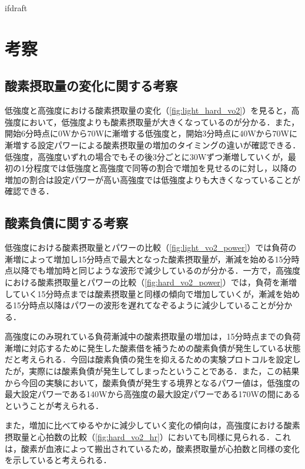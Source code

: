 \expandafter\ifx\csname ifdraft\endcsname\relax
 
\fi

\section{考察}

\subsection{酸素摂取量の変化に関する考察}

低強度と高強度における酸素摂取量の変化（\ref{fig:light_hard_vo2}）を見ると，高強度において，低強度よりも酸素摂取量が大きくなっているのが分かる．また，開始6分時点に0Wから70Wに漸増する低強度と，開始3分時点に40Wから70Wに漸増する設定パワーによる酸素摂取量の増加のタイミングの違いが確認できる．低強度，高強度いずれの場合でもその後3分ごとに30Wずつ漸増していくが，最初の1分程度では低強度と高強度で同等の割合で増加を見せるのに対し，以降の増加の割合は設定パワーが高い高強度では低強度よりも大きくなっていることが確認できる．

\subsection{酸素負債に関する考察}

低強度における酸素摂取量とパワーの比較（\ref{fig:light_vo2_power}）では負荷の漸増によって増加し15分時点で最大となった酸素摂取量が，漸減を始める15分時点以降でも増加時と同じような波形で減少しているのが分かる．一方で，高強度における酸素摂取量とパワーの比較（\ref{fig:hard_vo2_power}）では，負荷を漸増していく15分時点までは酸素摂取量と同様の傾向で増加していくが，漸減を始める15分時点以降はパワーの波形を遅れてなぞるように減少していることが分かる．

高強度にのみ現れている負荷漸減中の酸素摂取量の増加は，15分時点までの負荷漸増に対応するために発生した酸素借を補うための酸素負債が発生している状態だと考えられる．今回は酸素負債の発生を抑えるための実験プロトコルを設定したが，実際には酸素負債が発生してしまったということである．また，この結果から今回の実験において，酸素負債が発生する境界となるパワー値は，低強度の最大設定パワーである140Wから高強度の最大設定パワーである170Wの間にあるということが考えられる．

また，増加に比べてゆるやかに減少していく変化の傾向は，高強度における酸素摂取量と心拍数の比較（\ref{fig:hard_vo2_hr}）においても同様に見られる．これは，酸素が血液によって搬出されているため，酸素摂取量が心拍数と同様の変化を示していると考えられる．

